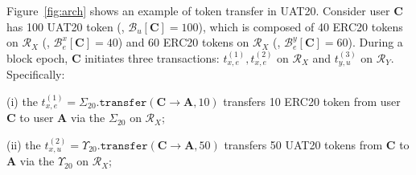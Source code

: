 




 Figure~\ref{fig:arch} shows an example of token transfer in UAT20.
Consider user \textbf{C} has 100 UAT20 token (\ie, $\mathcal{B}_u[\mathbf{C}] = 100$), which is composed of 40 ERC20 tokens on $\mathcal{R}_X$ (\ie, $\mathcal{B}^x_e[\mathbf{C}] = 40$) and 60 ERC20 tokens on $\mathcal{R}_X$ (\ie, $\mathcal{B}^y_e[\mathbf{C}] = 60$). During a block epoch, \textbf{C} initiates three transactions: $t^{(1)}_{x,e}, t^{(2)}_{x,e}$ on $\mathcal{R}_X$ and $t^{(3)}_{y,u}$
on $\mathcal{R}_Y$. Specifically:

(i) the $t^{(1)}_{x,e} = \Sigma_{20}.\mathtt{transfer}(\mathbf{C}\rightarrow \mathbf{A},10)$ transfers 10 ERC20 token from user \textbf{C} to user \textbf{A} via the $\Sigma_{20}$ on $\mathcal{R}_X$; 

(ii) the $t^{(2)}_{x,u} = \Upsilon_{20}.\mathtt{transfer}(\mathbf{C}\rightarrow \mathbf{A},50)$ transfers 50 UAT20 tokens from $\mathbf{C}$ to $\mathbf{A}$ via the $\Upsilon_{20}$ on $\mathcal{R}_X$;

